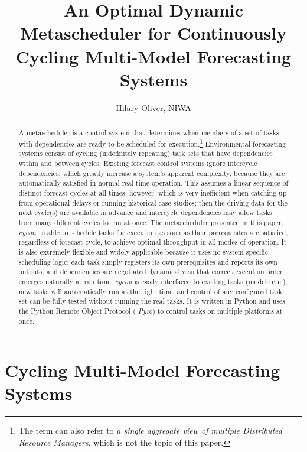 \documentclass[11pt,a4paper]{article}
\title{An Optimal Dynamic Metascheduler for Continuously Cycling
Multi-Model Forecasting Systems}
\author{Hilary Oliver, NIWA}
\begin{document}
\maketitle

\begin{abstract}

    A metascheduler is a control system that determines when members of
    a set of tasks with dependencies are ready to be scheduled for
    execution.\footnote{The term can also refer to {\it a single
    aggregate view of multiple Distributed Resource Managers}, which is
    not the topic of this paper.} Environmental forecasting systems
    consist of cycling (indefinitely repeating) task sets that have
    dependencies within and between cycles. Existing forecast control
    systems ignore intercycle dependencies, which greatly increase a
    system's apparent complexity, because they are automatically
    satisfied in normal real time operation. This assumes a linear
    sequence of distinct forecast cycles at all times, however, which is
    very inefficient when catching up from operational delays or running
    historical case studies; then the driving data for the next cycle(s)
    are available in advance and intercycle dependencies may allow tasks
    from many different cycles to run at once.
    The metascheduler presented in this paper, {\em cycon}, is able to
    schedule tasks for execution as soon as their prerequisites are
    satisfied, regardless of forecast cycle, to achieve optimal
    throughput in all modes of operation. It is also extremely flexible
    and widely applicable because it uses no system-specific scheduling
    logic: each task simply registers its own prerequisites and reports
    its own outputs, and dependencies are negotiated dynamically so that
    correct execution order emerges naturally at run time. {\em cycon}
    is easily interfaced to existing tasks (models etc.), new tasks will
    automatically run at the right time, and control of any configured
    task set can be fully tested without running the real tasks. It is
    written in Python and uses the Python Remote Object Protocol ({\em
    Pyro}) to control tasks on multiple platforms at once. 

\end{abstract}

\pagebreak
\tableofcontents
\pagebreak

\section{Cycling Multi-Model Forecasting Systems}
\end{document}
